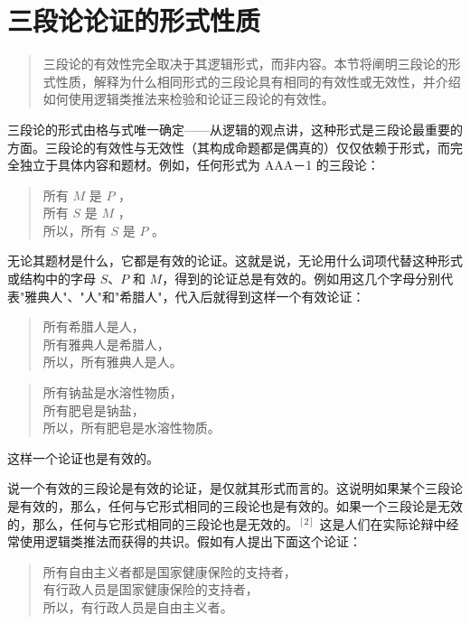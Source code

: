 \section{三段论论证的形式性质}

\begin{quotation}
三段论的有效性完全取决于其逻辑形式，而非内容。本节将阐明三段论的形式性质，解释为什么相同形式的三段论具有相同的有效性或无效性，并介绍如何使用逻辑类推法来检验和论证三段论的有效性。
\end{quotation}

三段论的形式由格与式唯一确定——从逻辑的观点讲，这种形式是三段论最重要的方面。三段论的有效性与无效性（其构成命题都是偶真的）仅仅依赖于形式，而完全独立于具体内容和题材。例如，任何形式为 AAA－1 的三段论：

\begin{quote}
所有 $M$ 是 $P$ ，\\
所有 $S$ 是 $M$ ，\\
所以，所有 $S$ 是 $P$ 。
\end{quote}

无论其题材是什么，它都是有效的论证。这就是说，无论用什么词项代替这种形式或结构中的字母 $S$、$P$ 和 $M$，得到的论证总是有效的。例如用这几个字母分别代表"雅典人"、"人"和"希腊人"，代入后就得到这样一个有效论证：

\begin{quote}
所有希腊人是人，\\
所有雅典人是希腊人，\\
所以，所有雅典人是人。
\end{quote}

\begin{quote}
所有钠盐是水溶性物质，\\
所有肥皂是钠盐，\\
所以，所有肥皂是水溶性物质。
\end{quote}

这样一个论证也是有效的。

说一个有效的三段论是有效的论证，是仅就其形式而言的。这说明如果某个三段论是有效的，那么，任何与它形式相同的三段论也是有效的。如果一个三段论是无效的，那么，任何与它形式相同的三段论也是无效的。$^{[2]}$ 这是人们在实际论辩中经常使用逻辑类推法而获得的共识。假如有人提出下面这个论证：

\begin{quote}
所有自由主义者都是国家健康保险的支持者，\\
有行政人员是国家健康保险的支持者，\\
所以，有行政人员是自由主义者。
\end{quote}

